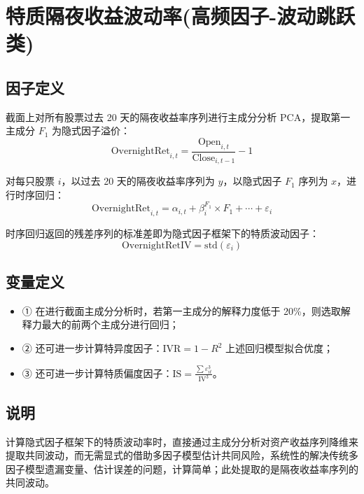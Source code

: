 \documentclass{article}
\begin{document}
\section{特质隔夜收益波动率(高频因子-波动跳跃类)}

\subsection{因子定义}

截面上对所有股票过去 20 天的隔夜收益率序列进行主成分分析 PCA，提取第一主成分 \( F_1 \) 为隐式因子溢价：
\begin{equation}
    \mathrm{OvernightRet}_{i,t} = \frac{\mathrm{Open}_{i,t}}{\mathrm{Close}_{i,t-1}} - 1
\end{equation}

对每只股票 \( i \)，以过去 20 天的隔夜收益率序列为 \( y \)，以隐式因子 \( F_1 \) 序列为 \( x \)，进行时序回归：
\begin{equation}
    \mathrm{OvernightRet}_{i,t} = \alpha_{i,t} + \beta_i^{F_1} \times F_1 + \cdots + \varepsilon_i
\end{equation}

时序回归返回的残差序列的标准差即为隐式因子框架下的特质波动因子：
\begin{equation}
    \mathrm{OvernightRetIV} = \mathrm{std}(\varepsilon_i)
\end{equation}

\subsection{变量定义}
\begin{itemize}
    \item ① 在进行截面主成分分析时，若第一主成分的解释力度低于 20\%，则选取解释力最大的前两个主成分进行回归；
    \item ② 还可进一步计算特异度因子：\( \mathrm{IVR} = 1 - R^2 \) 上述回归模型拟合优度；
    \item ③ 还可进一步计算特质偏度因子：\( \mathrm{IS} = \frac{\sum \varepsilon_{it}^3}{\mathrm{IV}^3} \)。
\end{itemize}

\subsection{说明}
计算隐式因子框架下的特质波动率时，直接通过主成分分析对资产收益序列降维来提取共同波动，而无需显式的借助多因子模型估计共同风险，系统性的解决传统多因子模型遗漏变量、估计误差的问题，计算简单；此处提取的是隔夜收益率序列的共同波动。
\end{document}
